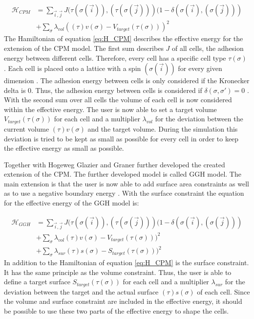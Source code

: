 \begin{equation}\label{eq:H_CPM}
\begin{split}
\mathcal{H}_{CPM} & = \sum_{\vec{i},\vec{j}}^{ }J(\tau(\sigma(\vec{i})),(\tau(\sigma(\vec{j})))(1-\delta(\sigma(\vec{i}),(\sigma(\vec{j}))) \\
		 & + \sum_{\sigma}^{}{\lambda_{vol}((\tau)v(\sigma)-V_{target}(\tau(\sigma)))^2}
\end{split}
\end{equation}
The Hamiltonian of equation \ref{eq:H_CPM} describes the effective energy for the extension of the \ac{CPM} model. The first sum describes $J$ of all cells, the adhesion energy between different cells. Therefore, every cell has a specific cell type $\tau(\sigma)$ \cite{Glazier1993, Graner1992}. Each cell is placed onto a lattice with a spin $(\sigma(\vec{i}))$ for every given dimension \cite{Graner1992, Glazier2007}. The adhesion energy between cells is only considered if the Kronecker delta is 0. Thus, the adhesion energy between cells is considered if $\delta(\sigma, \sigma') = 0$ \cite{Glazier1993, Graner1992, Stott1999, Glazier2007, Chen2007, Cickovski2005}. \newline
With the second sum over all cells the volume of each cell is now considered within the effective energy. The user is now able to set a target volume $V_{target}(\tau(\sigma))$ for each cell and a multiplier $\lambda_{vol}$ for the deviation between the current volume $(\tau)v(\sigma)$ and the target volume. During the simulation this deviation is tried to be kept as small as possible for every cell in order to keep the effective energy as small as possible.

Together with Hogeweg Glazier and Graner further developed the created extension of the \ac{CPM}. The further developed model is called \ac{GGH} model. The main extension is that the user is now able to add surface area constraints \cite{Graner1992, Glazier1993, Glazier2007} as well as to use a negative boundary energy \cite{Glazier2007}. With the surface constraint the equation for the effective energy of the \ac{GGH} model is:

\begin{equation}\label{eq:H_GGH}
\begin{split}
\mathcal{H}_{GGH} & = \sum_{\vec{i},\vec{j}}^{ }J(\tau(\sigma(\vec{i})),(\tau(\sigma(\vec{j})))(1-\delta(\sigma(\vec{i}),(\sigma(\vec{j}))) \\
		 & + \sum_{\sigma}^{}{\lambda_{vol}(\tau)v(\sigma)-V_{target}(\tau(\sigma)))^2} \\
		 & + \sum_{\sigma}^{}{\lambda_{sur}(\tau)s(\sigma)-S_{target}(\tau(\sigma)))^2}
\end{split}
\end{equation}
In addition to the Hamiltonian of equation \ref{eq:H_CPM} is the surface constraint. It has the same principle as the volume constraint. Thus, the user is able to define a target surface $S_{target}(\tau(\sigma))$ for each cell and a multiplier $\lambda_{sur}$ for the deviation between the target and the actual surface $(\tau)s(\sigma)$ of each cell. Since the volume and surface constraint are included in the effective energy, it should be possible to use these two parts of the effective energy to shape the cells.


